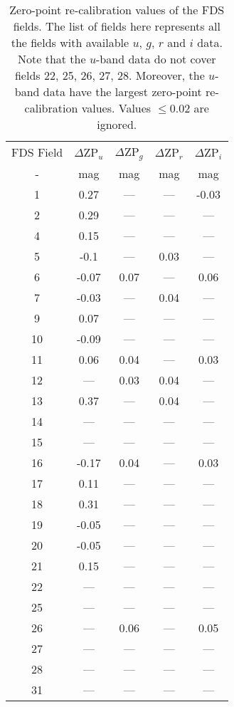 \documentclass[fleqn,usenatbib]{mnras}
\begin{document}
\begin{table}
\centering
\caption{Zero-point re-calibration values of the FDS fields. The list of fields here represents all the fields with available $u$, $g$, $r$ and $i$ data. Note that the $u$-band data do not cover fields 22, 25, 26, 27, 28. Moreover, the $u$-band data have the largest zero-point re-calibration values. Values $\leq$0.02 are ignored.}
\begin{tabular}{ ccccc } \hline  
FDS Field & $\Delta$ZP$_u$ & $\Delta$ZP$_g$ & $\Delta$ZP$_r$ & $\Delta$ZP$_i$\\
- & mag & mag & mag & mag \\ 
\hline
1 & 0.27 & --- & --- & -0.03 \\
2 & 0.29 & --- & --- & ---\\
4 & 0.15 & --- & --- & ---\\
5 & -0.1 & --- & 0.03 & ---\\
6 & -0.07 & 0.07 & --- & 0.06 \\
7 & -0.03 & --- & 0.04 & ---\\
9 & 0.07 & --- & --- & ---\\
10 & -0.09 & --- & --- & ---\\
11 & 0.06 & 0.04 & --- & 0.03 \\
12 & --- & 0.03 & 0.04 & ---\\
13 & 0.37 & --- & 0.04 & ---\\
14 & --- & --- & --- & ---\\
15 & --- & --- & --- & ---\\
16 & -0.17 & 0.04 & --- & 0.03 \\
17 & 0.11 & --- & --- & ---\\
18 & 0.31 & --- & --- & ---\\
19 & -0.05 & --- & --- & ---\\
20 & -0.05 & --- & --- & ---\\
21 & 0.15 & --- & --- & ---\\
22 & --- & --- & --- & ---\\
25 & --- & --- & --- & ---\\
26 & --- & 0.06 & --- & 0.05 \\
27 & --- & --- & --- & ---\\
28 & --- & --- & --- & ---\\
31 & --- & --- & --- & ---\\
\hline 
\end{tabular}
\label{zpcorr}
\end{table}
\end{document}
